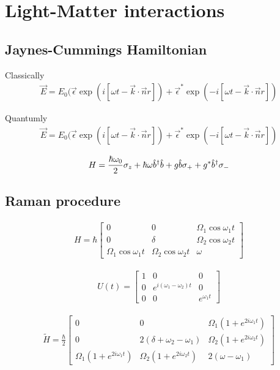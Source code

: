 \section{Light-Matter interactions}

\subsection{Jaynes-Cummings Hamiltonian}

Classically
\begin{align}
  \vec{E} = E_0 (\vec{\epsilon}\exp(i[\omega t - \vec{k}\cdot\vec{n}r]) + \vec{\epsilon}^*\exp(-i[\omega t - \vec{k}\cdot\vec{n}r])
\end{align}

Quantumly
\begin{align}
  \vec{E} = E_0 (\vec{\epsilon}\exp(i[\omega t - \vec{k}\cdot\vec{n}r]) + \vec{\epsilon}^*\exp(-i[\omega t - \vec{k}\cdot\vec{n}r])
\end{align}

\begin{align}
  H = \frac{\hbar \omega_0}{2} \mathbf{\sigma}_z + \hbar \omega \hat{b}^\dagger\hat{b} + g\hat{b} \mathbf{\sigma}_{+} + g^{*}\hat{b}^\dagger \mathbf{\sigma}_{-}
\end{align}

\subsection{Raman procedure}


\begin{align}
  H=\hbar
  \begin{bmatrix}
    0 & 0 & \Omega_1 \cos\omega_1 t \\
    0 & \delta & \Omega_2 \cos\omega_2 t \\
    \Omega_1 \cos\omega_1 t & \Omega_2 \cos\omega_2 t & \omega
  \end{bmatrix}
\end{align}

\begin{align}
  U(t) = 
  \begin{bmatrix}
    1 & 0 & 0 \\
    0 & e^{i(\omega_1 - \omega_2)t} & 0 \\
    0 & 0 & e^{\omega_1 t}
  \end{bmatrix}
\end{align}

\begin{align}
  \tilde{H}=\frac{\hbar}{2}
  \begin{bmatrix}
    0 & 0 & \Omega_1(1+e^{2i\omega_1 t}) \\
    0 & 2(\delta + \omega_2 - \omega_1) & \Omega_2 (1+e^{2i\omega_2 t}) \\
    \Omega_1(1+e^{2i\omega_1 t}) & \Omega_2 (1+e^{2i\omega_2 t}) & 2(\omega - \omega_1)
  \end{bmatrix}
\end{align}


